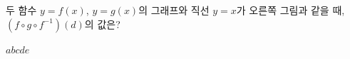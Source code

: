 \hspace*{2mm}\begin{minipage}[t]{\dimexpr\linewidth-2mm\relax}\vspace{0pt}
\noindent\begin{minipage}[t]{0.58\linewidth}\vspace{0pt}\raggedright 두 함수 $y=f(x)$, $y=g(x)$의 그래프와 직선 $y=x$가 오른쪽 그림과 같을 때, $(f\circ g\circ f^{-1})(d)$의 값은? \end{minipage}\hfill\begin{minipage}[t]{0.4\linewidth}\vspace{0pt}\centering \resizebox{\ifdim\width>\linewidth\linewidth\else\width\fi}{!}{}\end{minipage}\par
\begin{choices32}{$a$}{$b$}{$c$}{$d$}{$e$}\end{choices32}\end{minipage}
